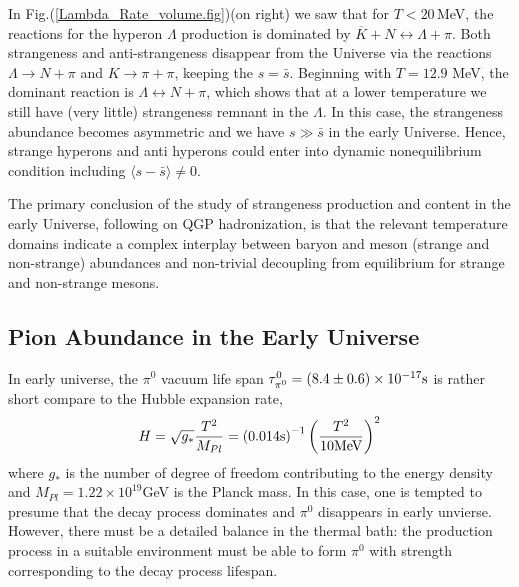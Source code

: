 \documentclass[universe,article,submit,moreauthors,pdftex,a4paper]{Definitions/mdpi}
\begin{document}
\begin{itemize}
 In Fig.(\ref{Lambda_Rate_volume.fig})(on right) we saw that for $T<20$\,MeV, the reactions for the hyperon $\Lambda$ production is dominated by $\overline{K}+N\leftrightarrow\Lambda+\pi$. Both strangeness and anti-strangeness disappear from the Universe via the reactions $\Lambda\rightarrow N+\pi$ and $K\to\pi+\pi$, keeping the $s=\bar s$. Beginning with $T=12.9$ MeV, the dominant reaction is $\Lambda\leftrightarrow N+\pi$, which shows that at a lower temperature we still have (very little) strangeness remnant in the $\Lambda$. In this case, the strangeness abundance becomes asymmetric and we have $s\gg\bar{s}$ in the early Universe. Hence, strange hyperons and anti hyperons could enter into dynamic nonequilibrium condition including $\langle s-\bar s\rangle \ne 0$.
\end{itemize}
The primary conclusion of the study of strangeness production and content in the early Universe, following on QGP hadronization, is that the relevant temperature domains indicate a complex interplay between baryon and meson (strange and non-strange) abundances and non-trivial decoupling from equilibrium for strange and non-strange mesons.



\subsection{Pion Abundance in the Early Universe}\label{sec:Pions}
\noindent 
In early universe, the $\pi^0$ vacuum life span $\tau_{\pi^0}^0=(8.4\pm0.6)\times10^{-17} {\rm s}$ is rather short compare to the Hubble expansion rate,
\begin{align}
H=\sqrt{g_\ast}\frac{T^2}{M_{Pl}}=\left(0.014{\rm s}\right)^{-1}\left(\frac{T^2}{10{\rm MeV}}\right)^2
\end{align}
where $g_\ast$ is the number of degree of freedom contributing to the energy density and $M_{Pl}=1.22\times10^{19}$GeV is the Planck mass. In this case, one is tempted to presume that the decay process dominates and $\pi^0$ disappears in early unvierse. However, there must be a detailed balance in the thermal bath: the production process in a suitable environment must be able to form $\pi^0$ with strength corresponding to the decay process lifespan. 
\end{document}

